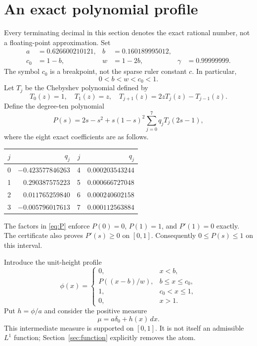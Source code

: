 \documentclass[11pt,a4paper]{article}
\theoremstyle{remark}\newtheorem{remark}[theorem]{Remark}
\begin{document}
\section{An exact polynomial profile}
Every terminating decimal in this section denotes the exact rational number, not a floating-point approximation. Set
\begin{align*}
 a&=0.626600210121, & b&=0.160189995012,\\
 c_0&=1-b, & w&=1-2b, & \gamma&=0.99999999.
\end{align*}
The symbol $c_0$ is a breakpoint, not the sparse ruler constant $c$. In particular,
\[
 0<b<w<c_0<1.
\]
Let $T_j$ be the Chebyshev polynomial defined by
\[
 T_0(z)=1,\quad T_1(z)=z,\quad T_{j+1}(z)=2zT_j(z)-T_{j-1}(z).
\]
Define the degree-ten polynomial
\begin{equation}\label{eq:P}
 P(s)=2s-s^2+s(1-s)^2\sum_{j=0}^7 q_jT_j(2s-1),
\end{equation}
where the eight exact coefficients are as follows.
\begin{center}
\begin{tabular}{cr@{\qquad}cr}
\toprule
$j$ & $q_j$ & $j$ & $q_j$\\
\midrule
0 & $-0.423577846263$ & 4 & $0.000203543244$\\
1 & $ 0.290387575223$ & 5 & $0.000666727048$\\
2 & $ 0.011765259840$ & 6 & $0.000240602158$\\
3 & $-0.005796017613$ & 7 & $0.000112563884$\\
\bottomrule
\end{tabular}
\end{center}
The factors in \eqref{eq:P} enforce $P(0)=0$, $P(1)=1$, and $P'(1)=0$ exactly. The certificate also proves $P'(s)\ge0$ on $[0,1]$. Consequently $0\le P(s)\le1$ on this interval.

Introduce the unit-height profile
\begin{equation}\label{eq:phi}
 \phi(x)=\begin{cases}
 0,&x<b,\\
 P((x-b)/w),&b\le x\le c_0,\\
 1,&c_0<x\le1,\\
 0,&x>1.
 \end{cases}
\end{equation}
Put $h=\phi/a$ and consider the positive measure
\begin{equation}\label{eq:mu}
 \mu=a\delta_0+h(x)\,dx.
\end{equation}
This intermediate measure is supported on $[0,1]$. It is not itself an admissible $L^1$ function; Section~\ref{sec:function} explicitly removes the atom.
\end{document}
